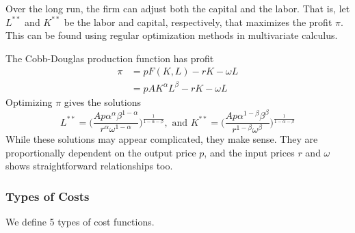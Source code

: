 \documentclass{article}
\begin{document}
      Over the long run, the firm can adjust both the capital and the labor. That is, let $L^{**}$ and $K^{**}$ be the labor and capital, respectively, that maximizes the profit $\pi$. This can be found using regular optimization methods in multivariate calculus. 

      \begin{example}
        \label{ex:cobb-douglas}
        The Cobb-Douglas production function has profit
        \begin{align*}
            \pi & = p F(K, L) - r K - \omega L \\
            & = p A K^\alpha L^\beta - r K - \omega L
        \end{align*}
        Optimizing $\pi$ gives the solutions 
        \begin{equation}
          L^{**} = \Bigg(\frac{A p \alpha^\alpha \beta^{1-\alpha}}{r^\alpha \omega^{1-\alpha}} \Bigg)^{\frac{1}{1-\alpha-\beta}}, \text{ and } K^{**} = \Bigg(\frac{A p \alpha^{1-\beta} \beta^\beta}{r^{1-\beta} \omega^\beta}\Bigg)^{\frac{1}{1-\alpha-\beta}}
        \end{equation}
        While these solutions may appear complicated, they make sense. They are proportionally dependent on the output price $p$, and the input prices $r$ and $\omega$ shows straightforward relationships too. 
      \end{example}

    \subsubsection{Types of Costs}

      We define 5 types of cost functions. 
\end{document}
